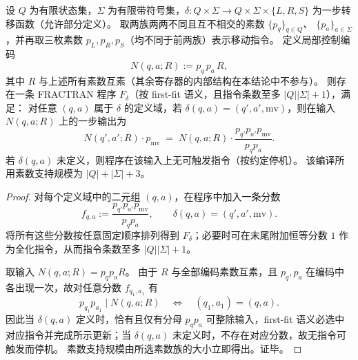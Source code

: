 \begin{theorem}\label{thm:pom-fractran-tm-local-compile-prime-sparse}
设 \(Q\) 为有限状态集，\(\Sigma\) 为有限带符号集，\(\delta:Q\times \Sigma\to Q\times \Sigma\times\{L,R,S\}\) 为一步转移函数（允许部分定义）。
取两族两两不同且互不相交的素数
\(
\{p_q\}_{q\in Q}
\)、
\(
\{p_a\}_{a\in \Sigma}
\)，并再取三枚素数 \(p_L,p_R,p_S\)（均不同于前两族）表示移动指令。
定义局部控制编码
\[
N(q,a;R):=p_q\,p_a\,R,
\]
其中 \(R\) 与上述所有素数互素（其余寄存器的内部结构在本结论中不参与）。
则存在一条 FRACTRAN 程序 \(F_\delta\)（按 first-fit 语义，且指令条数至多 \(|Q||\Sigma|+1\)），满足：
对任意 \((q,a)\) 属于 \(\delta\) 的定义域，若
\(
\delta(q,a)=(q',a',\mathrm{mv})
\)，则在输入 \(N(q,a;R)\) 上的一步输出为
\[
N(q',a';R)\cdot p_{\mathrm{mv}}
\;=\;
N(q,a;R)\cdot \frac{p_{q'}p_{a'}p_{\mathrm{mv}}}{p_qp_a}.
\]
若 \(\delta(q,a)\) 未定义，则程序在该输入上无可触发指令（按约定停机）。
该编译所用素数支持规模为 \(|Q|+|\Sigma|+3\)。
\end{theorem}
\begin{proof}
对每个定义域中的二元组 \((q,a)\)，在程序中加入一条分数
\[
f_{q,a}:=\frac{p_{q'}p_{a'}p_{\mathrm{mv}}}{p_qp_a},
\qquad \delta(q,a)=(q',a',\mathrm{mv}).
\]
将所有这些分数按任意固定顺序排列得到 \(F_\delta\)；必要时可在末尾附加恒等分数 \(1\) 作为全化指令，从而指令条数至多 \(|Q||\Sigma|+1\)。
\par
取输入 \(N(q,a;R)=p_qp_aR\)。
由于 \(R\) 与全部编码素数互素，且 \(p_q,p_a\) 在编码中各出现一次，故对任意分数 \(f_{q_1,a_1}\) 有
\[
p_{q_1}p_{a_1}\mid N(q,a;R)\quad\Longleftrightarrow\quad (q_1,a_1)=(q,a).
\]
因此当 \(\delta(q,a)\) 定义时，恰有且仅有分母 \(p_qp_a\) 可整除输入，first-fit 语义必选中对应指令并完成所示更新；当 \(\delta(q,a)\) 未定义时，不存在对应分数，故无指令可触发而停机。
素数支持规模由所选素数族的大小立即得出。证毕。
\end{proof}


